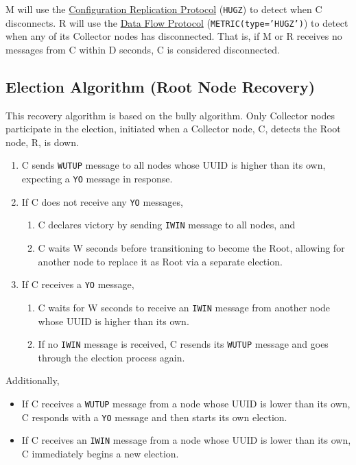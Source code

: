 M will use the \hyperref[proto_config]{Configuration Replication Protocol} (\texttt{HUGZ}) to detect when C disconnects.
R will use the \hyperref[proto_data]{Data Flow Protocol} (\texttt{METRIC(type='HUGZ')}) to detect when any of its
Collector nodes has disconnected. That is, if M or R receives no messages from C within D seconds, C is considered
disconnected.

\subsection{Election Algorithm (Root Node Recovery)}
\label{algor_elect}

This recovery algorithm is based on the bully algorithm\cite{needed}. Only Collector nodes participate in the election,
initiated when a Collector node, C, detects the Root node, R, is down.

\begin{enumerate}
\item C sends \texttt{WUTUP} message to all nodes whose UUID is higher than its own, expecting a \texttt{YO} message in
      response.
\item If C does not receive any \texttt{YO} messages,
      \begin{enumerate}
      \item C declares victory by sending \texttt{IWIN} message to all nodes, and
      \item C waits W seconds before transitioning to become the Root, allowing for another node to replace it as Root
            via a separate election.
      \end{enumerate}
\item If C receives a \texttt{YO} message,
      \begin{enumerate}
      \item C waits for W seconds to receive an \texttt{IWIN} message from another node whose UUID is higher than its
            own.
      \item If no \texttt{IWIN} message is received, C resends its \texttt{WUTUP} message and goes through the election
            process again.
      \end{enumerate}
\end{enumerate}

Additionally,

\begin{itemize}
\item If C receives a \texttt{WUTUP} message from a node whose UUID is lower than its own, C responds with a \texttt{YO}
      message and then starts its own election.
\item If C receives an \texttt{IWIN} message from a node whose UUID is lower than its own, C immediately begins a new
      election.
\end{itemize}

